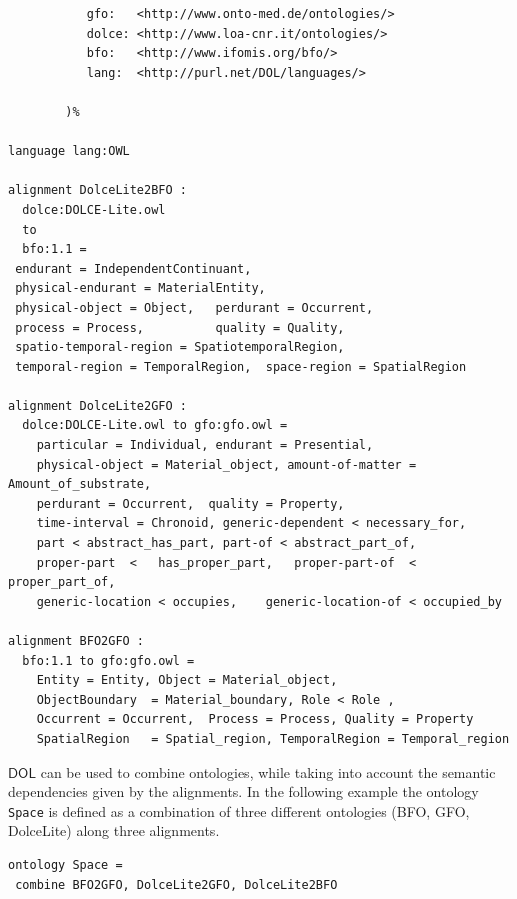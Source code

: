 \documentclass[10pt,fleqn,final]{scrreprt}
\newcommand*{\DOL}{\ensuremath{\mathsf{DOL}}\xspace}
\newenvironment{definitions}[0]{\medskip }{}
\begin{document}
\begin{definitions}
\begin{lstlisting}[basicstyle=\ttfamily\footnotesize,language=dolText,escapechar=@,mathescape]
%prefix(
           gfo:   <http://www.onto-med.de/ontologies/>
           dolce: <http://www.loa-cnr.it/ontologies/>
           bfo:   <http://www.ifomis.org/bfo/>
           lang:  <http://purl.net/DOL/languages/>

        )%

language lang:OWL

alignment DolceLite2BFO :
  dolce:DOLCE-Lite.owl
  to
  bfo:1.1 =
 endurant = IndependentContinuant,
 physical-endurant = MaterialEntity,
 physical-object = Object,   perdurant = Occurrent,
 process = Process,          quality = Quality,
 spatio-temporal-region = SpatiotemporalRegion,
 temporal-region = TemporalRegion,  space-region = SpatialRegion

alignment DolceLite2GFO :
  dolce:DOLCE-Lite.owl to gfo:gfo.owl =
 	particular = Individual, endurant = Presential,
 	physical-object = Material_object, amount-of-matter = Amount_of_substrate,
 	perdurant = Occurrent, 	quality = Property,
 	time-interval = Chronoid, generic-dependent < necessary_for,
 	part < abstract_has_part, part-of < abstract_part_of,
 	proper-part  <	 has_proper_part,  	proper-part-of  < proper_part_of,
 	generic-location < occupies, 	generic-location-of < occupied_by

alignment BFO2GFO :
  bfo:1.1 to gfo:gfo.owl =
	Entity = Entity, Object = Material_object,
	ObjectBoundary  = Material_boundary, Role < Role ,
 	Occurrent = Occurrent, 	Process = Process, Quality = Property
 	SpatialRegion 	= Spatial_region, TemporalRegion = Temporal_region 	
\end{lstlisting}


 \DOL can be used to combine ontologies, while taking into account the semantic dependencies given by the alignments. In the following example the ontology \lstinline{Space} is defined as a combination of three different ontologies (BFO, GFO, DolceLite) along three alignments. 

\begin{lstlisting}[basicstyle=\ttfamily\footnotesize,language=dolText,escapechar=@,mathescape]
ontology Space =
 combine BFO2GFO, DolceLite2GFO, DolceLite2BFO
\end{lstlisting} 


\end{definitions}
\end{document}
